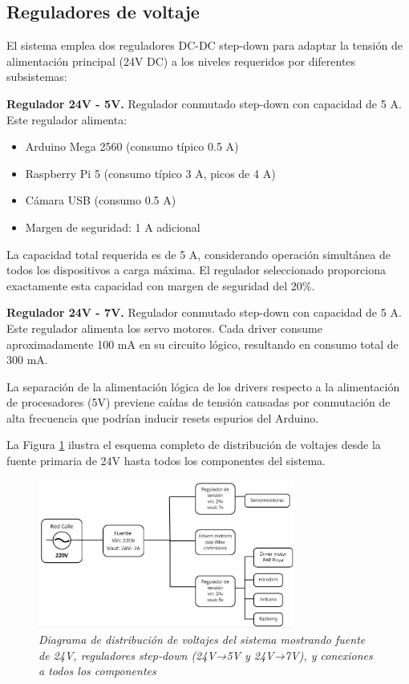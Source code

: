 \subsection{Reguladores de voltaje}

El sistema emplea dos reguladores DC-DC step-down para adaptar la tensión de alimentación principal (24V DC) a los niveles requeridos por diferentes subsistemas:

\textbf{Regulador 24V - 5V.} Regulador conmutado step-down con capacidad de 5 A. Este regulador alimenta:
\begin{itemize}[label=$\bullet$]
\item Arduino Mega 2560 (consumo típico 0.5 A)
\item Raspberry Pi 5 (consumo típico 3 A, picos de 4 A)
\item Cámara USB (consumo 0.5 A)
\item Margen de seguridad: 1 A adicional
\end{itemize}

La capacidad total requerida es de 5 A, considerando operación simultánea de todos los dispositivos a carga máxima. El regulador seleccionado proporciona exactamente esta capacidad con margen de seguridad del 20\%.

\textbf{Regulador 24V - 7V.} Regulador conmutado step-down con capacidad de 5 A. Este regulador alimenta los servo motores. Cada driver consume aproximadamente 100 mA en su circuito lógico, resultando en consumo total de 300 mA.

La separación de la alimentación lógica de los drivers respecto a la alimentación de procesadores (5V) previene caídas de tensión causadas por conmutación de alta frecuencia que podrían inducir resets espurios del Arduino.

La Figura \ref{fig:diagrama_voltajes} ilustra el esquema completo de distribución de voltajes desde la fuente primaria de 24V hasta todos los componentes del sistema.

\begin{figure}[H]
\centering
\includegraphics[width=0.75\textwidth]{imagenes/diagrama_voltajes.jpg}
\caption{\textit{Diagrama de distribución de voltajes del sistema mostrando fuente de 24V, reguladores step-down (24V→5V y 24V→7V), y conexiones a todos los componentes}}
\label{fig:diagrama_voltajes}
\end{figure}
